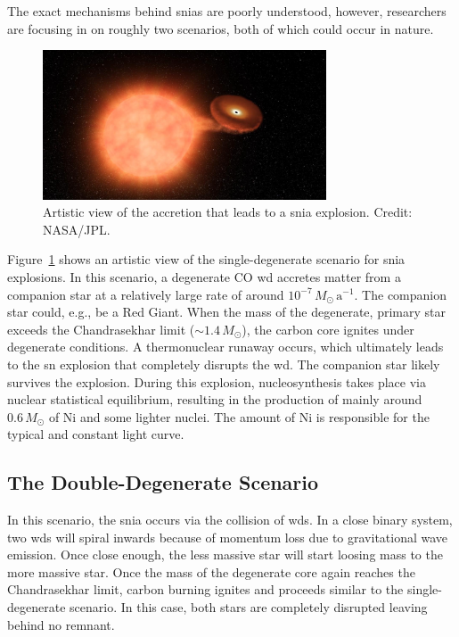 The exact mechanisms behind \acp{snia} are poorly understood, however, researchers are focusing in on roughly two scenarios, both of which could occur in nature.
\begin{figure}[tb]
    \centering
    \includegraphics[width=0.75\textwidth]{graphics/massive_stars/sn-ia-artistic}
    \caption{Artistic view of the accretion that leads to a \ac{snia} explosion. Credit: NASA/JPL.}
    \label{fig:massive_stars:sn_ia_artistic}
\end{figure}
Figure~\ref{fig:massive_stars:sn_ia_artistic} shows an artistic view of the single-degenerate scenario for \ac{snia} explosions. In this scenario, a degenerate CO \ac{wd} accretes matter from a companion star at a relatively large rate of around $10^{-7}\,M_\odot\,\mathrm{a}^{-1}$. The companion star could, e.g., be a Red Giant. When the mass of the degenerate, primary star exceeds the Chandrasekhar limit ($\sim1.4\,M_\odot$), the carbon core ignites under degenerate conditions. A thermonuclear runaway occurs, which ultimately leads to the \ac{sn} explosion that completely disrupts the \ac{wd}. The companion star likely survives the explosion. During this explosion, nucleosynthesis takes place via nuclear statistical equilibrium, resulting in the production of mainly around $0.6\,M_\odot$ of Ni and some lighter nuclei. The amount of Ni is responsible for the typical and constant light curve.


\subsection{The Double-Degenerate Scenario}

In this scenario, the \ac{snia} occurs via the collision of \acp{wd}. In a close binary system, two \acp{wd} will spiral inwards because of momentum loss due to gravitational wave emission. Once close enough, the less massive star will start loosing mass to the more massive star. Once the mass of the degenerate core again reaches the Chandrasekhar limit, carbon burning ignites and proceeds similar to the single-degenerate scenario. In this case, both stars are completely disrupted leaving behind no remnant.


